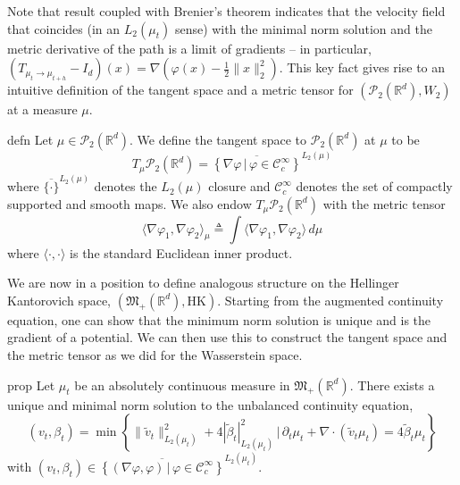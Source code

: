 \documentclass[11pt]{article}
\newcommand{\posm}{\mathfrak{M}_+(\mathbb{R}^d)}
\begin{document}
Note that result coupled with Brenier's theorem indicates that the velocity field that coincides (in an $L_2(\mu_t)$ sense) with the minimal norm solution and the metric derivative of the path is a limit of gradients -- in particular, $(T_{\mu_t \rightarrow \mu_{t+h}} - I_d)(x) = \nabla (\varphi(x) - \frac{1}{2}\|x\|_2^2)$. This key fact gives rise to an intuitive definition of the tangent space and a metric tensor for $(\mathcal{P}_{2}(\mathbb{R}^d), W_2)$ at a measure $\mu$. 

\begin{restatable}{defn}{}
    Let $\mu \in \mathcal{P}_2(\mathbb{R}^d)$. We define the tangent space to $\mathcal{P}_2(\mathbb{R}^d)$ at $\mu$ to be 
    \begin{equation}
        T_\mu \mathcal{P}_2(\mathbb{R}^d) = \overline{\left\{\nabla \varphi \, | \, \varphi \in \mathcal{C}_c^{\infty}\right\}}^{L_2(\mu)}
    \end{equation}
    where $\overline{\{\cdot \}}^{L_2(\mu)}$ denotes the $L_2(\mu)$ closure and $\mathcal{C}_c^{\infty}$ denotes the set of compactly supported and smooth maps. We also endow $T_\mu \mathcal{P}_2(\mathbb{R}^d)$ with the metric tensor
    \begin{equation}
        \langle \nabla \varphi_1, \nabla \varphi_2\rangle_{\mu} \triangleq \int \langle\nabla\varphi_1, \nabla\varphi_2 \rangle \,d\mu 
    \end{equation}
    where $\langle \cdot, \cdot \rangle$ is the standard Euclidean inner product.
\end{restatable}
We are now in a position to define analogous structure on the Hellinger Kantorovich space, $(\posm, \text{HK})$. Starting from the augmented continuity equation, one can show that the minimum norm solution is unique and is the gradient of a potential. We can then use this to construct the tangent space and the metric tensor as we did for the Wasserstein space.
\begin{restatable}{prop}{}
    Let $\mu_t$ be an absolutely continuous measure in $\mathfrak{M}_+(\mathbb{R}^d).$ There exists a unique and minimal norm solution to the unbalanced continuity equation,
    \begin{equation*}
        (v_t, \beta_t) = \min\left\{\|\tilde v_t\|_{L_2(\mu_t)}^2 + 4|\tilde \beta_t|_{L_2(\mu_t)}^2  \, \Big| \, \partial_t\mu_t + \nabla \cdot (\tilde v_t \mu_t) = 4\tilde \beta_t \mu_t\right\}
    \end{equation*}
    with $(v_t, \beta_t) \in \overline{\left\{(\nabla \varphi, \varphi) \, | \, \varphi \in \mathcal{C}^{\infty}_{c}\right\}}^{L_2(\mu_t)}$.
\end{restatable}
\end{document}
